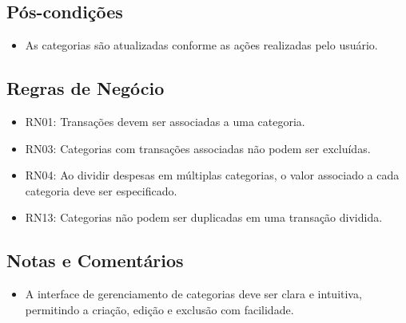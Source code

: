 \subsection*{Pós-condições}
\begin{addmargin}[1.5cm]{0cm}
	\begin{itemize}
		\item As categorias são atualizadas conforme as ações realizadas pelo usuário.
	\end{itemize}
\end{addmargin}

\subsection*{Regras de Negócio}
\begin{addmargin}[1.5cm]{0cm}
	\begin{itemize}
		\item RN01: Transações devem ser associadas a uma categoria.
		\item RN03: Categorias com transações associadas não podem ser excluídas.
		\item RN04: Ao dividir despesas em múltiplas categorias, o valor associado a cada categoria deve ser especificado.
		\item RN13: Categorias não podem ser duplicadas em uma transação dividida.
	\end{itemize}
\end{addmargin}

\subsection*{Notas e Comentários}
\begin{addmargin}[1.5cm]{0cm}
	\begin{itemize}
		\item A interface de gerenciamento de categorias deve ser clara e intuitiva, permitindo a criação, edição e exclusão com facilidade.
	\end{itemize}
\end{addmargin}
